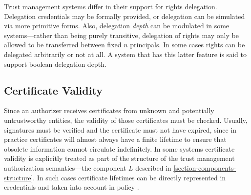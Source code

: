 Trust management systems differ in their support for rights delegation. Delegation credentials
may be formally provided, or delegation can be simulated via more primitive forms. Also,
delegation \emph{depth} can be modulated in some systems---rather than being purely transitive,
delegation of rights may only be allowed to be transferred between fixed $n$ principals. In some
cases rights can be delegated arbitrarily or not at all. A system that has this latter feature
is said to support boolean delegation depth.

%
%

\subsection{Certificate Validity}

Since an authorizer receives certificates from unknown and potentially untrustworthy entities,
the validity of those certificates must be checked. Usually, signatures must be verified and the
certificate must not have expired, since in practice certificates will almost always have a
finite lifetime to ensure that obsolete information cannot circulate indefinitely. In some
systems certificate validity is explicitly treated as part of the structure of the trust
management authorization semantics---the component $L$ described in
\autoref{section-components-structure}. In such cases certificate lifetimes can be directly
represented in credentials and taken into account in policy
\cite{Bauer:GFACSW,lbi-fc01,skalka-wang-chapin-jcs06}.

